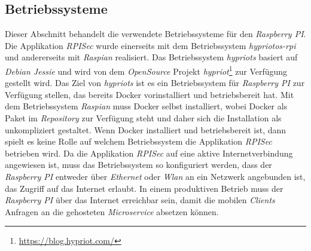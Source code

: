 \documentclass[]{article}
\begin{document}
\subsection{Betriebssysteme}
Dieser Abschnitt behandelt die verwendete Betriebssysteme für den \emph{Raspberry PI}. Die Applikation \emph{RPISec} wurde einerseits mit dem Betriebssystem \emph{hypriotos-rpi} und andererseits mit \emph{Raspian} realisiert. Das Betriebssystem \emph{hypriots} basiert auf \emph{Debian Jessie} und wird von dem \emph{OpenSource} Projekt \emph{hypriot}\footnote{\url{https://blog.hypriot.com/}} zur Verfügung gestellt wird. Das Ziel von \emph{hypriots} ist es ein Betriebssystem für \emph{Raspberry PI} zur Verfügung stellen, das bereits Docker vorinstalliert und betriebsbereit hat. Mit dem Betriebssystem \emph{Raspian} muss Docker selbst installiert, wobei Docker als Paket im \emph{Repository} zur Verfügung steht und daher sich die Installation als unkompliziert gestaltet.
\newline
\newline
Wenn Docker installiert und betriebsbereit ist, dann spielt es keine Rolle auf welchem Betriebssystem die Applikation \emph{RPISec} betrieben wird.
\newline
\newline
Da die Applikation \emph{RPISec} auf eine aktive Internetverbindung angewiesen ist, muss das Betriebssystem so konfiguriert werden, dass der \emph{Raspberry PI} entweder über \emph{Ethernet} oder \emph{Wlan} an ein Netzwerk angebunden ist, das Zugriff auf das Internet erlaubt. In einem produktiven Betrieb muss der \emph{Raspberry PI} über das Internet erreichbar sein, damit die mobilen \emph{Clients} Anfragen an die gehosteten \emph{Microservice} absetzen können.
\newpage
\end{document}
